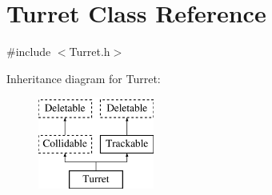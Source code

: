 \hypertarget{classTurret}{\section{Turret Class Reference}
\label{classTurret}
}


{\ttfamily \#include $<$Turret.\-h$>$}

Inheritance diagram for Turret\-:\begin{figure}[H]
\begin{center}
\leavevmode
\includegraphics[height=3.000000cm]{classTurret}
\end{center}
\end{figure}

